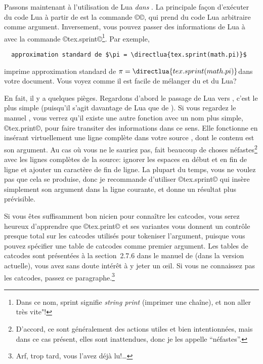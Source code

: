 \documentclass{lltxdoc}
\begin{document}
\medskip

Passons maintenant à l'utilisation de Lua \emph{dans} \luatex. La principale
façon d'exécuter du code Lua à partir de \tex est la commande ©\directlua©,
qui prend du code Lua arbitraire comme argument. Inversement, vous pouvez
passer des informations de Lua à \tex avec la commande ©tex.sprint©\footnote{Dans
  ce nom, \og{}sprint\gf{} signifie \og{}\emph{string print}\fg{}
  (\og{}imprimer une chaîne\fg{}), et non \og{}aller très vite"\fg{}!}.
Par exemple,
\begin{Verbatim}
  approximation standard de $\pi = \directlua{tex.sprint(math.pi)}$
\end{Verbatim}
imprime \og{}approximation standard de $\pi = \directlua{tex.sprint(math.pi)}$\fg dans votre document. Vous voyez comme il est facile de mélanger du \tex et du Lua?

En fait, il y a quelques pièges. Regardons d'abord le passage de Lua vers \tex,
c'est le plus simple (puisqu'il s'agit davantage de Lua que de \tex).
Si vous regardez le manuel \luatex, vous verrez qu'il existe une autre fonction
avec un nom plus simple, ©tex.print©, pour faire transiter des informations
dans ce sens. Elle fonctionne en insérant virtuellement une ligne complète
dans votre source \tex, dont le contenu est son argument. Au cas où vous ne
le sauriez pas, \tex fait beaucoup de choses néfastes\footnote{D'accord, ce
  sont généralement des actions utiles et bien intentionnées, mais dans ce
  cas présent, elles sont inattendues, donc je les appelle ``néfastes''.} avec
les lignes complètes de la source: ignorer les espaces en début et en fin
de ligne et ajouter un caractère de fin de ligne. La plupart du temps, vous
ne voulez pas que cela se produise, donc je recommande d'utiliser ©tex.sprint©
qui insère simplement son argument dans la ligne courante, et donne un résultat
plus prévisible.

Si vous êtes suffisamment bon \tex{}nicien pour connaître les catcodes,
vous serez heureux d'apprendre que ©tex.print© et ses variantes vous donnent
un contrôle presque total sur les catcodes utilisés pour tokeniser l'argument,
puisque vous pouvez spécifier une table de catcodes comme premier argument.
Les tables de catcodes sont présentées à la section~2.7.6 dans le manuel de
\luatex (dans la version actuelle), vous avez sans doute intérêt à y jeter
un \oe il. Si vous ne connaissez pas les catcodes, passez ce
paragraphe.\footnote{Arf, trop tard, vous l'avez déjà lu!\dots}

\medskip
\end{document}
